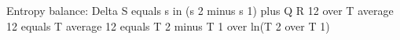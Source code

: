 Entropy balance: Delta S equals s in (s 2 minus s 1) plus Q R 12 over T average 12 equals
T average 12 equals T 2 minus T 1 over ln(T 2 over T 1)